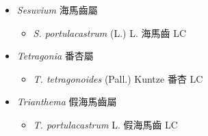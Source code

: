 
  \begin{itemize}
 \item[] \textit{Sesuvium} 海馬齒屬
                                
  \begin{itemize}
        \item[] \textit{S. portulacastrum} (L.) L.  海馬齒   LC
  \end{itemize}
 \item[] \textit{Tetragonia} 番杏屬
                                
  \begin{itemize}
        \item[] \textit{T. tetragonoides} (Pall.) Kuntze  番杏   LC
  \end{itemize}
 \item[] \textit{Trianthema} 假海馬齒屬
                                
  \begin{itemize}
        \item[] \textit{T. portulacastrum} L.  假海馬齒   LC
  \end{itemize}
  \end{itemize}

